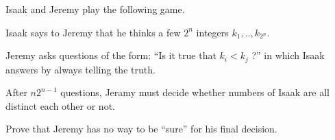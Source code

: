 Isaak and Jeremy play the following game.

Isaak says to Jeremy that he thinks a few $2^n$  integers $k_1,..,k_{2^n}$.

Jeremy asks questions of the form: ``Is it true that $k_i<k_j$ ?'' in which Isaak answers by always telling the truth.

After $n2^{n-1}$ questions, Jeramy must decide whether numbers of Isaak are all distinct each other or not.

Prove that Jeremy has no way to be ``sure'' for his final decision.
